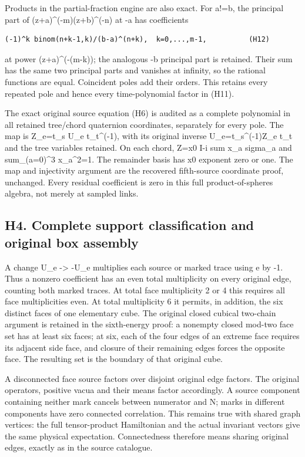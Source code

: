 \documentclass[11pt,a4paper]{article}
\newcounter{none}
\renewcommand{\[}{\begingroup\small\originaldisplaystart}
\renewcommand{\]}{\originaldisplayend\endgroup}
\begin{document}
Products in the partial-fraction engine are also exact. For a!=b, the
principal part of (z+a)\^{}(-m)(z+b)\^{}(-n) at -a has coefficients

\begin{verbatim}
(-1)^k binom(n+k-1,k)/(b-a)^(n+k),  k=0,...,m-1,          (H12)
\end{verbatim}

at power (z+a)\^{}(-(m-k)); the analogous -b principal part is retained.
Their sum has the same two principal parts and vanishes at infinity, so
the rational functions are equal. Coincident poles add their orders.
This retains every repeated pole and hence every time-polynomial factor
in (H11).

The exact original source equation (H6) is audited as a complete
polynomial in all retained tree/chord quaternion coordinates, separately
for every pole. The map is Z\_e=t\_s U\_e t\_t\^{}(-1), with its
original inverse U\_e=t\_s\^{}(-1)Z\_e t\_t and the tree variables
retained. On each chord, Z=x0 I-i sum x\_a sigma\_a and sum\_(a=0)\^{}3
x\_a\^{}2=1. The remainder basis has x0 exponent zero or one. The map
and injectivity argument are the recovered fifth-source coordinate
proof, unchanged. Every residual coefficient is zero in this full
product-of-spheres algebra, not merely at sampled links.

\subsection{H4. Complete support classification and original box
assembly}\label{h4.-complete-support-classification-and-original-box-assembly}

A change U\_e -\textgreater{} -U\_e multiplies each source or marked
trace using e by -1. Thus a nonzero coefficient has an even total
multiplicity on every original edge, counting both marked traces. At
total face multiplicity 2 or 4 this requires all face multiplicities
even. At total multiplicity 6 it permits, in addition, the six distinct
faces of one elementary cube. The original closed cubical two-chain
argument is retained in the sixth-energy proof: a nonempty closed
mod-two face set has at least six faces; at six, each of the four edges
of an extreme face requires its adjacent side face, and closure of their
remaining edges forces the opposite face. The resulting set is the
boundary of that original cube.

A disconnected face source factors over disjoint original edge factors.
The original operators, positive vacua and their means factor
accordingly. A source component containing neither mark cancels between
numerator and N; marks in different components have zero connected
correlation. This remains true with shared graph vertices: the full
tensor-product Hamiltonian and the actual invariant vectors give the
same physical expectation. Connectedness therefore means sharing
original edges, exactly as in the source catalogue.
\end{document}
